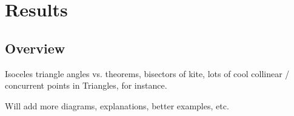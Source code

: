 \chapter{Results}
\label{chap:results}

\section{Overview}

Isoceles triangle angles vs. theorems, bisectors of kite, lots of cool
collinear / concurrent points in Triangles, for instance.

Will add more diagrams, explanations, better examples, etc.
